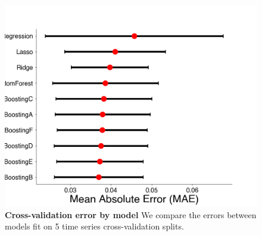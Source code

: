 \documentclass[11pt,oneside,letterpaper]{article}
\begin{document}
\begin{figure}[t!]
    \centering
    \includegraphics[width=1.0\textwidth=0.01]{./supplementary_figures/growth-rate-prediction-model-comparison.png}
    \caption{
      \textbf{Cross-validation error by model}
      We compare the errors between models fit on 5 time series cross-validation splits.
    }
    \label{fig:growth_rate_predictions_model_comparison}
\end{figure}
\end{document}
